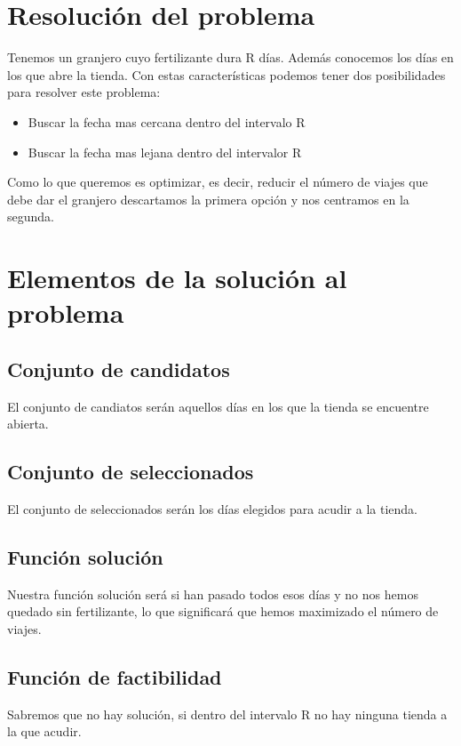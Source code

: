 
\section{Resolución del problema}

Tenemos un granjero cuyo fertilizante dura R días. Además conocemos los días en los que abre la tienda.
Con estas características podemos tener dos posibilidades para resolver este problema:
\begin{itemize}
	\item Buscar la fecha mas cercana dentro del intervalo R
	\item Buscar la fecha mas lejana dentro del intervalor R
\end{itemize}

Como lo que queremos es optimizar, es decir, reducir el número de viajes que debe dar el granjero descartamos la primera opción y nos centramos en la segunda.


\section{Elementos de la solución al problema}

\subsection{Conjunto de candidatos}
El conjunto de candiatos serán aquellos días en los que la tienda se encuentre abierta.

\subsection{Conjunto de seleccionados}
El conjunto de seleccionados serán los días elegidos para acudir a la tienda.

\subsection{Función solución}
Nuestra función solución será si han pasado todos esos días y no nos hemos quedado sin fertilizante, lo que significará que hemos maximizado el número de viajes.

\subsection{Función de factibilidad}
Sabremos que no hay solución, si dentro del intervalo R no hay ninguna tienda a la que acudir.

